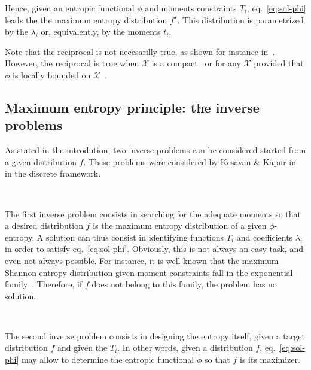 \documentclass[english,sort&compress]{elsarticle}
\theoremstyle{definition}
\theoremstyle{plain}
\theoremstyle{plain}
\def\X{\mathcal{X}}
\begin{document}
Hence,  given  an entropic  functional  $\phi$  and moments  constraints  $T_i$,
eq.~\eqref{eq:sol-phi}  leads the  the maximum  entropy distribution  $f^\star$.
This distribution  is parametrized by  the $\lambda_i$ or, equivalently,  by the
moments $t_i$.

Note  that  the reciprocal  is  not  necesarilly  true,  as shown  for  instance
in~\cite{BorLew93}.   However,  the   reciprocal  is   true  when   $\X$  is   a
compact~\cite{Gir97} or for any $\X$ provided  that $\phi$ is locally bounded on
$\X$~\cite{Gir07}.





\subsection{Maximum entropy principle: the inverse problems}

As stated  in the introdution,  two inverse  problems can be  considered started
from a  given distribution $f$.   These problems  were considered by  Kesavan \&
Kapur in~\cite{KesKap89} in the discrete framework.

\

The first inverse problem consists in searching for the adequate moments so that
a  desired distribution  $f$  is the  maximum entropy  distribution  of a  given
$\phi$-entropy. A solution  can thus consist in identifying  functions $T_i$ and
coefficients $\lambda_i$ in order  to satisfy eq.~\eqref{eq:sol-phi}. Obviously,
this is not always an easy task, and even not always possible.  For instance, it
is  well  known that  the  maximum  Shannon  entropy distribution  given  moment
constraints   fall  in   the  exponential   family~\cite{CovTho06,  BorLew91:05,
  Arn01}. Therefore, if $f$  does not belong to this family,  the problem has no
solution.

\

The second  inverse problem consists  in designing  the entropy itself,  given a
target  distribution  $f$  and  given  the  $T_i$.   In  other  words,  given  a
distribution  $f$, eq.~\eqref{eq:sol-phi}  may allow  to determine  the entropic
functional $\phi$ so that $f$ is its maximizer.
\end{document}
